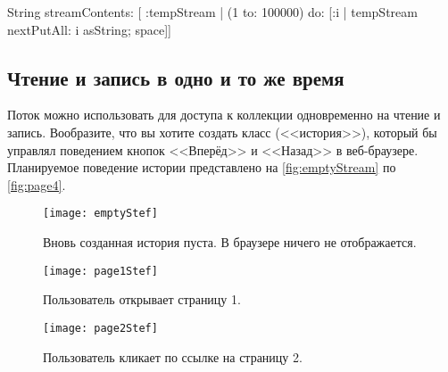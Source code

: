 \documentclass[a4paper,10pt,twoside]{book}
\begin{document}
\begin{code}{}
String streamContents: [ :tempStream |
  (1 to: 100000)
       do: [:i | tempStream nextPutAll: i asString; space]] 
\end{code}

\subsection{Чтение и запись в одно и то же время}

Поток можно использовать для доступа к коллекции одновременно на чтение и запись.
Вообразите, что вы хотите создать класс  (<<история>>), который бы управлял поведением кнопок <<Вперёд>> и <<Назад>> в веб-браузере.
Планируемое поведение истории представлено на \ref{fig:emptyStream} по \ref{fig:page4}.

\begin{figure}[!ht]
\centerline{\texttt{[image: emptyStef]}}
\caption{Вновь созданная история пуста. В браузере ничего не отображается.}
\vspace{.2in}
\end{figure}

\begin{figure}[!ht]
\centerline{\texttt{[image: page1Stef]}}
\caption{Пользователь открывает страницу 1.}
\vspace{.2in}
\end{figure}

\begin{figure}[!ht]
\centerline{\texttt{[image: page2Stef]}}
\caption{Пользователь кликает по ссылке на страницу 2.}
\vspace{.2in}
\end{figure}
\end{document}
